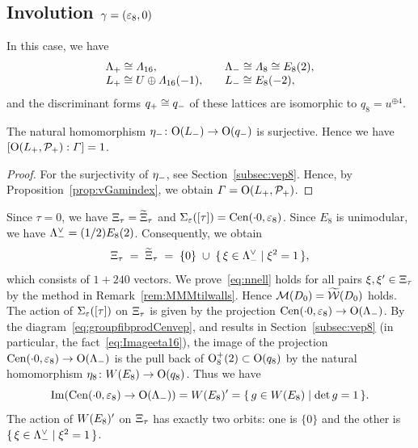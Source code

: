 \documentclass{amsart} %
\begin{document}
\subsection{Involution $\gamma=(\varepsilon_8, 0)$}\label{subsec:walls8}
%
In this case, we have
\[
\begin{array}{ll}
\Lambda_{+}\cong \varLambda_{16}, \quad &\Lambda_{-}\cong \varLambda_{8}\cong E_8(2),\\
L_{+}\cong U\oplus \varLambda_{16}(-1), \quad &L_{-}\cong E_8(-2),
\end{array}
\]
%
and the discriminant forms $q_{+}\cong q_{-}$ of these lattices are 
isomorphic to $q_8=u^{\oplus 4}$.
%
\begin{proposition}\label{prop:indexvep8}
The natural homomorphism ${\eta}_{-}\colon \mathord{\mathrm{O}}(L_{-})\to \mathord{\mathrm{O}}(q_{-})$ is surjective.
Hence we have $[\mathord{\mathrm{O}}(L_{+}, \mathord{\mathcal{P}}_{+}): \varGamma]=1$.
\end{proposition}
%
\begin{proof}
For the surjectivity of ${\eta}_{-}$, see Section~\ref{subsec:vep8}.
Hence, by Proposition~\ref{prop:vGamindex}, we obtain $\varGamma=\mathord{\mathrm{O}}(L_{+}, \mathord{\mathcal{P}}_{+})$.
\end{proof}
%
Since $\tau=0$,
we have $\Xi_{\tau}=\widetilde{\Xi}_{\tau} $ and $\Sigma_{\varepsilon}([\tau])=\mathrm{Cen}(\cdot 0, \varepsilon_{8})$.
Since $E_8$ is unimodular, we have $\Lambda_{-}^{\vee}=(1/2)E_8(2)$.
Consequently, we obtain 
\[
\Xi_{\tau}\;=\;\widetilde{\Xi}_{\tau} \; =\; \{0\}\;\cup\;\{\,{\xi\in \Lambda_{-}^{\vee}}\mid {\xi^2=1} \,\},
\]
which consists of $1+240$ vectors.
We prove~\eqref{eq:nnell} holds for all pairs $\xi, \xi^{\prime}\in \Xi_{\tau}$
by the method in Remark~\ref{rem:MMMtilwalls}.
Hence 
$\mathord{\mathcal{M}}(D_0)=\widetilde{\mathord{\mathcal{W}}}(D_0)$ holds.
%
%
%
The action of $\Sigma_{\varepsilon}([\tau])$ on $\Xi_{\tau}$
is given by the projection 
$\mathrm{Cen}(\cdot 0, \varepsilon_{8})\to \mathord{\mathrm{O}}(\Lambda_{-})$.
By the diagram~\eqref{eq:groupfibprodCenvep}, and results in Section~\ref{subsec:vep8}
(in particular, the fact~\eqref{eq:Imageeta16}), 
the image of the projection  $\mathrm{Cen}(\cdot 0, \varepsilon_{8})\to \mathord{\mathrm{O}}(\Lambda_{-})$ is 
the pull back of $\mathord{\mathrm{O}}^{+}_8(2)\subset \mathord{\mathrm{O}}(q_8)$ by the natural homomorphism 
$\eta_8\colon W(E_8)\to \mathord{\mathrm{O}}(q_8)$.
Thus we have 
\[
\operatorname{Im}(\mathrm{Cen}(\cdot 0, \varepsilon_{8})\to \mathord{\mathrm{O}}(\Lambda_{-}) )=W(E_8)^{\prime}=\{\,{g\in W(E_8)}\mid {\det g=1} \,\}.
\]
The action of $W(E_8)^{\prime}$ on $\Xi_{\tau}$ has exactly two orbits:
one is 
$\{0\}$ and the other is $\{\,{\xi\in \Lambda_{-}^{\vee}}\mid {\xi^2=1} \,\}$.
\end{document}
